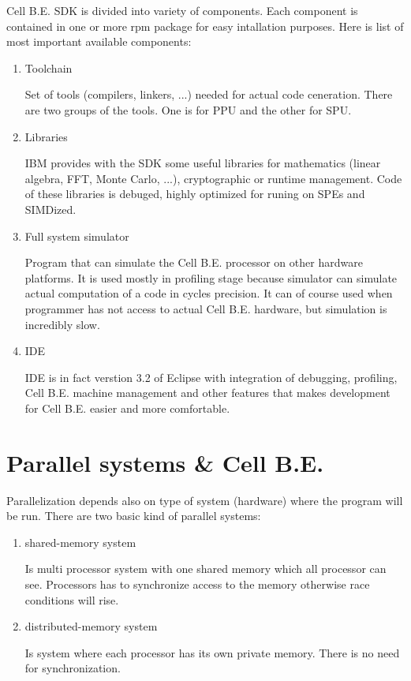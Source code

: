 Cell B.E. SDK is divided into variety of components.
Each component is contained in one or more rpm package for easy intallation purposes.
Here is list of most important available components:
\begin{enumerate}
  \item {Toolchain}
  \par
  Set of tools (compilers, linkers, ...) needed for actual code ceneration.
There are two groups of the tools.
One is for PPU and the other for SPU.

  \item {Libraries}
  \par
  IBM provides with the SDK some useful libraries for mathematics (linear algebra, FFT, Monte Carlo, ...), cryptographic or runtime management.
Code of these libraries is debuged, highly optimized for runing on SPEs and SIMDized.

  \item {Full system simulator}
  \par
  Program that can simulate the Cell B.E. processor on other hardware platforms.
It is used mostly in profiling stage because simulator can simulate actual computation of a code in cycles precision.
It can of course used when programmer has not access to actual Cell B.E. hardware, but simulation is incredibly slow.

  \item {IDE}
  \par
  IDE is in fact verstion 3.2 of Eclipse with integration of debugging, profiling, Cell B.E. machine management and other features that makes development for Cell B.E. easier and more comfortable.
\end{enumerate}


\section{Parallel systems \& Cell B.E.}

Parallelization depends also on type of system (hardware) where the program will be run.
There are two basic kind of parallel systems:
\begin{enumerate}
\item {shared-memory system}
\par
Is multi processor system with one shared memory which all processor can see.
Processors has to synchronize access to the memory otherwise race conditions will rise.

\item {distributed-memory system}
\par
Is system where each processor has its own private memory.
There is no need for synchronization.
\end{enumerate}


